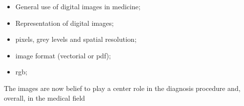 \documentclass[../main.tex]{subfiles}
\begin{document}
\begin{itemize}

    \item General use of digital images in medicine;
    \item Representation of digital images;
    \item pixels, grey levels and spatial resolution;
    \item image format (vectorial or pdf);
    \item rgb;
\end{itemize}
The images are now belief to play a center role in the diagnosis procedure and, overall, in the medical field
\end{document}
